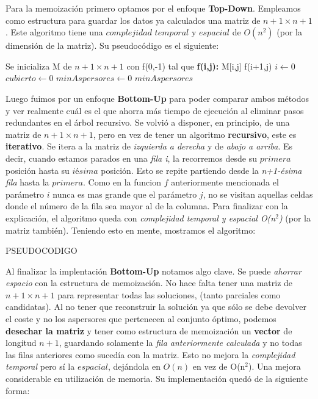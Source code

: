 Para la memoizaci\'on primero optamos por el enfoque \textbf{Top-Down}. Empleamos como estructura para guardar los datos ya calculados una matriz de $n+1 \times n+1$. Este algoritmo tiene una $complejidad$ $temporal$ y $espacial$ de $O(n^{2})$ (por la dimensi\'on de la matriz). Su pseudoc\'odigo es el siguiente:
\newline

\begin{algorithm}
\caption{menorCostoTopDown(A):}
\begin{algorithmic} 
\STATE Se inicializa M de $n+1 \times n+1$ con \bottom
\RETURN f(0,-1) tal que
\STATE \textbf{f(i,j):}
\ENDIF
{}
\ENDIF
{}
\STATE M[i,j] \leftarrow f(i+1,j) 
\ENDIF
\ENDIF
\STATE $i \leftarrow 0$
\STATE $cubierto \leftarrow 0$
\STATE $minAspersores \leftarrow 0$
\RETURN $minAspersores$
\end{algorithmic}
\end{algorithm}
\newline

Luego fuimos por un enfoque \textbf{Bottom-Up} para poder comparar ambos m\'etodos y ver realmente cu\'al es el que ahorra m\'as tiempo de ejecuci\'on al eliminar pasos redundantes en el \'arbol recursivo. Se volvi\'o a disponer, en principio, de una matriz de $n+1 \times n+1$, pero en vez de tener un algoritmo \textbf{recursivo}, este es \textbf{iterativo}. Se itera a la matriz de \textit{izquierda a derecha} y de \textit{abajo a arriba}. Es decir, cuando estamos parados en una \textit{fila i}, la recorremos desde su $primera$ posici\'on hasta su $iésima$ posici\'on. Esto se repite partiendo desde la \textit{n+1-ésima fila} hasta la $primera$. Como en la funcion $f$ anteriormente mencionada el par\'ametro $i$ nunca es mas grande que el par\'ametro $j$, no se visitan aquellas celdas donde el n\'umero de la fila sea mayor al de la columna. Para finalizar con la explicaci\'on, el algoritmo queda con \textit{complejidad temporal y espacial O(n$^{2}$)} (por la matriz tambi\'en). Teniendo esto en mente, mostramos el algoritmo:
\newline

PSEUDOCODIGO
\newline

Al finalizar la implentaci\'on \textbf{Bottom-Up} notamos algo clave. Se puede \textit{ahorrar espacio} con la estructura de memoizaci\'on. No hace falta tener una matriz de $n+1 \times n+1$ para representar todas las soluciones, (tanto parciales como candidatas). Al no tener que reconstruir la soluci\'on ya que s\'olo se debe devolver el coste y no los aspersores que pertenecen al conjunto \'optimo, podemos \textbf{desechar la matriz} y tener como estructura de memoizaci\'on un \textbf{vector} de longitud $n+1$, guardando solamente la \textit{fila anteriormente calculada} y no todas las filas anteriores como suced\'ia con la matriz. Esto no mejora la \textit{complejidad temporal} pero s\'i la $espacial$, dej\'andola en $O(n)$ en vez de O(n$^{2}$). Una mejora considerable en utilizaci\'on de memoria. Su implementaci\'on qued\'o de la siguiente forma:
\newline

